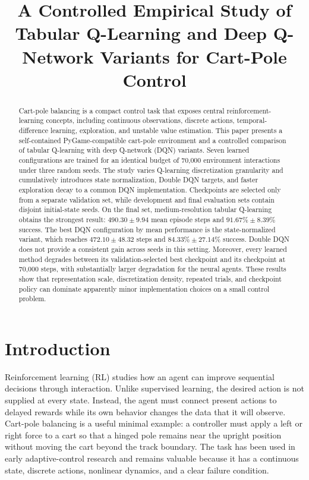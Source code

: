 \documentclass[conference]{IEEEtran}
\title{A Controlled Empirical Study of Tabular Q-Learning and Deep
Q-Network Variants for Cart-Pole Control}
\author{
\IEEEauthorblockN{Chenglin Li}
\IEEEauthorblockA{Participant 006\\Session 1 Robotics Experiments}
}
\begin{document}
\maketitle

\begin{abstract}
Cart-pole balancing is a compact control task that exposes central
reinforcement-learning concepts, including continuous observations, discrete
actions, temporal-difference learning, exploration, and unstable value
estimation. This paper presents a self-contained PyGame-compatible cart-pole
environment and a controlled comparison of tabular Q-learning with deep
Q-network (DQN) variants. Seven learned configurations are trained for an
identical budget of 70,000 environment interactions under three random seeds.
The study varies Q-learning discretization granularity and cumulatively
introduces state normalization, Double DQN targets, and faster exploration
decay to a common DQN implementation. Checkpoints are selected only from a
separate validation set, while development and final evaluation sets contain
disjoint initial-state seeds. On the final set, medium-resolution tabular
Q-learning obtains the strongest result: $490.30\pm9.94$ mean episode steps and
$91.67\%\pm8.39\%$ success. The best DQN configuration by mean performance is
the state-normalized variant, which reaches $472.10\pm48.32$ steps and
$84.33\%\pm27.14\%$ success. Double DQN does not provide a consistent gain
across seeds in this setting. Moreover, every learned method degrades between
its validation-selected best checkpoint and its checkpoint at 70,000 steps,
with substantially larger degradation for the neural agents. These results
show that representation scale, discretization density, repeated trials, and
checkpoint policy can dominate apparently minor implementation choices on a
small control problem.
\end{abstract}

\section{Introduction}

Reinforcement learning (RL) studies how an agent can improve sequential
decisions through interaction. Unlike supervised learning, the desired action
is not supplied at every state. Instead, the agent must connect present
actions to delayed rewards while its own behavior changes the data that it
will observe. Cart-pole balancing is a useful minimal example: a controller
must apply a left or right force to a cart so that a hinged pole remains near
the upright position without moving the cart beyond the track boundary. The
task has been used in early adaptive-control research
\cite{barto1983cartpole} and remains valuable because it has a continuous
state, discrete actions, nonlinear dynamics, and a clear failure condition.
\end{document}
